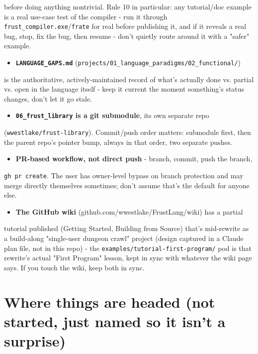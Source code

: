 \documentclass{book}
\begin{document}
  before doing anything nontrivial. Rule 10 in particular: any tutorial/doc
  example is a real use-case test of the compiler - run it through
  \texttt{frust_compiler.exe}/\texttt{frate} for real before publishing it, and if it
  reveals a real bug, stop, fix the bug, then resume - don't quietly route
  around it with a "safer" example.
\begin{itemize}
\item \textbf{\texttt{LANGUAGE_GAPS.md}} (\texttt{projects/01_language_paradigms/02_functional/})
\end{itemize}
  is the authoritative, actively-maintained record of what's actually done
  vs. partial vs. open in the language itself - keep it current the moment
  something's status changes, don't let it go stale.
\begin{itemize}
\item \textbf{\texttt{06_frust_library} is a git submodule}, its own separate repo
\end{itemize}
  (\texttt{wwestlake/frust-library}). Commit/push order matters: submodule first,
  then the parent repo's pointer bump, always in that order, two separate
  pushes.
\begin{itemize}
\item \textbf{PR-based workflow, not direct push} - branch, commit, push the branch,
\end{itemize}
  \texttt{gh pr create}. The user has owner-level bypass on branch protection and
  may merge directly themselves sometimes; don't assume that's the default
  for anyone else.
\begin{itemize}
\item \textbf{The GitHub wiki} (github.com/wwestlake/FrustLang/wiki) has a partial
\end{itemize}
  tutorial published (Getting Started, Building from Source) that's
  mid-rewrite as a build-along "single-user dungeon crawl" project (design
  captured in a Claude plan file, not in this repo) - the
  \texttt{examples/tutorial-first-program/} pod is that rewrite's actual "First
  Program" lesson, kept in sync with whatever the wiki page says. If you
  touch the wiki, keep both in sync.

\section{Where things are headed (not started, just named so it isn't a surprise)}
\end{document}
